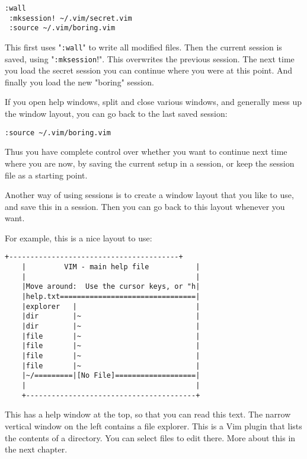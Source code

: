 \begin{Verbatim}[samepage=true]
 :wall
 :mksession! ~/.vim/secret.vim
 :source ~/.vim/boring.vim
\end{Verbatim}

This first uses "\verb!:wall!" to write all modified files.
Then the current session is saved, using "\verb!:mksession!!".
This overwrites the previous session.
The next time you load the secret session you can continue where you were at this point.
And finally you load the new "boring" session.

If you open help windows, split and close various windows, and generally mess up the window layout, you can go back to the last saved session:

\begin{Verbatim}[samepage=true]
 :source ~/.vim/boring.vim
\end{Verbatim}

Thus you have complete control over whether you want to continue next time where you are now, by saving the current setup in a session, or keep the session file as a starting point.

Another way of using sessions is to create a window layout that you like to use, and save this in a session.
Then you can go back to this layout whenever you want.

For example, this is a nice layout to use:

\begin{Verbatim}[samepage=true]
    +----------------------------------------+
    |         VIM - main help file           |
    |                                        |
    |Move around:  Use the cursor keys, or "h|
    |help.txt================================|
    |explorer   |                            |
    |dir        |~                           |
    |dir        |~                           |
    |file       |~                           |
    |file       |~                           |
    |file       |~                           |
    |file       |~                           |
    |~/=========|[No File]===================|
    |                                        |
    +----------------------------------------+
\end{Verbatim}

This has a help window at the top, so that you can read this text.
The narrow vertical window on the left contains a file explorer.
This is a Vim plugin that lists the contents of a directory.
You can select files to edit there.
More about this in the next chapter.


